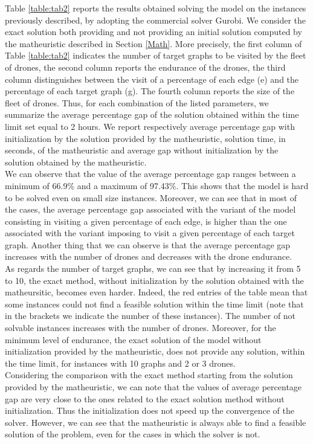 \noindent
Table \ref{table:tab2} reports the results obtained solving the \AMD model on the instances previously described, by adopting the commercial solver Gurobi. We consider the exact solution both providing and not providing an initial solution computed by the matheuristic described in Section \ref{Math}. More precisely, the first column of Table \ref{table:tab2} indicates the number of target graphs to be visited by the fleet of drones, the second column reports the endurance of the drones, the third column distinguishes between the visit of a percentage of each edge (e) and the percentage of each target graph (g). The fourth column reports the size of the fleet of drones. Thus, for each combination of the listed parameters, we summarize the average percentage gap of the solution obtained within the time limit set equal to 2 hours. We report respectively average percentage gap with initialization by the solution provided by the matheuristic, solution time, in seconds, of the matheuristic and average gap without initialization by the solution obtained by the matheuristic.\\
We can observe that the value of the average percentage gap ranges between a minimum of 66.9\% and a maximum of 97.43\%. This shows that the model is hard to be solved even on small size instances. Moreover, we can see that in most of the cases, the average percentage gap associated with the variant of the model consisting in visiting a given percentage of each edge, is higher than the one associated with the variant imposing to visit a given percentage of each target graph. Another thing that we can observe is that the average percentage gap increases with the number of drones and decreases with the drone endurance.\\
As regards the number of target graphs, we can see that by increasing it from 5 to 10, the exact method, without initialization by the solution obtained with the matheursitic, becomes even harder. Indeed, the red entries of the table mean that some instances could not find a feasible solution within the time limit (note that in the brackets we indicate the number of these instances). The number of not solvable instances increases with the number of drones. Moreover, for the minimum level of endurance, the exact solution of the model without initialization provided by the matheuristic, does not provide any solution, within the time limit, for instances with 10 graphs and 2 or 3 drones.\\
Considering the comparison with the exact method starting from the solution provided by the matheuristic, we can note that the values of average percentage gap are very close to the ones related to the exact solution method without initialization. Thus the initialization does not speed up the convergence of the solver. However, we can see that the matheuristic is always able to find a feasible solution of the problem, even for the cases in which the solver is not.\\

